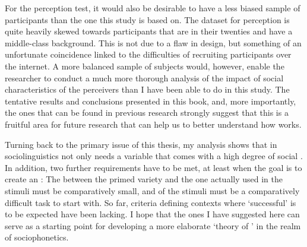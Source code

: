For the perception test, it would also be desirable to have a less biased sample of participants than the one this study is based on.
The dataset for perception is quite heavily skewed towards participants that are in their twenties and have a middle-class background.
This is not due to a flaw in design, but something of an unfortunate coincidence linked to the difficulties of recruiting participants over the internet.
A more balanced sample of subjects would, however, enable the researcher to conduct a much more thorough analysis of the impact of social characteristics of the perceivers than I have been able to do in this study.
The tentative results and conclusions presented in this book, and, more importantly, the ones that can be found in previous research \parencite[cf.][]{hayetal2006a,haydrager2010} strongly suggest that this is a fruitful area for future research that can help us to better understand how  works.

Turning back to the primary issue of this thesis, my analysis shows that   in sociolinguistics not only needs a variable that comes with a high degree of social .
In addition, two further requirements have to be met, at least when the goal is to create an : 
The  between the primed variety and the one actually used in the stimuli must be comparatively small, and  of the stimuli must be a comparatively difficult task to start with.
So far, criteria defining contexts where `successful'   is to be expected have been lacking.
I hope that the ones I have suggested here can serve as a starting point for developing a more elaborate `theory of ' \parencite[cf.][]{cesario2014} in the realm of sociophonetics.